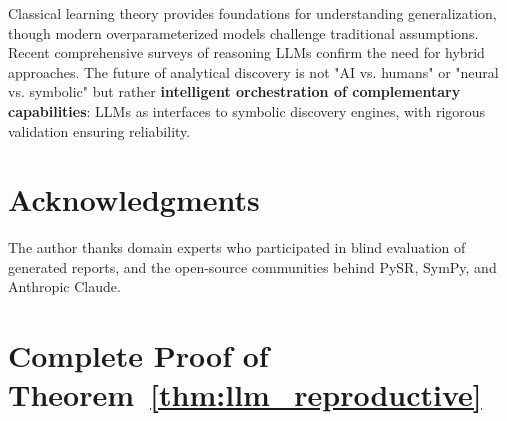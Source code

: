 \documentclass[twoside,11pt]{article}
\begin{document}
Classical learning theory \citep{vapnik1999overview,bishop2006pattern,goodfellow2016deep} provides foundations for understanding generalization, though modern overparameterized models challenge traditional assumptions. Recent comprehensive surveys \citep{zhang2025survey} of reasoning LLMs confirm the need for hybrid approaches. The future of analytical discovery is not "AI vs. humans" or "neural vs. symbolic" but rather \textbf{intelligent orchestration of complementary capabilities}: LLMs as interfaces to symbolic discovery engines, with rigorous validation ensuring reliability.

\section*{Acknowledgments}

The author thanks domain experts who participated in blind evaluation of generated reports, and the open-source communities behind PySR, SymPy, and Anthropic Claude.



\appendix

\section{Complete Proof of Theorem~\ref{thm:llm_reproductive}}
\label{app:proof}
\end{document}
